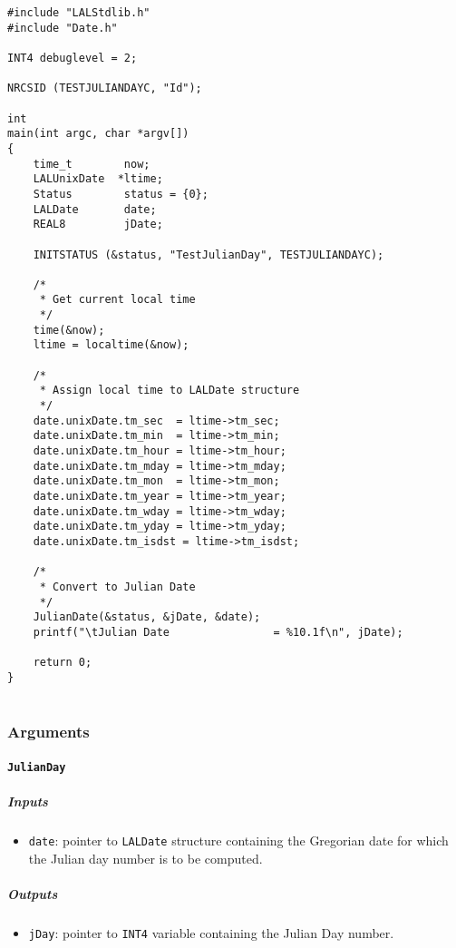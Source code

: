 \begin{verbatim}
#include "LALStdlib.h"
#include "Date.h"

INT4 debuglevel = 2;

NRCSID (TESTJULIANDAYC, "Id");

int
main(int argc, char *argv[])
{
    time_t        now;
    LALUnixDate  *ltime;
    Status        status = {0};
    LALDate       date;
    REAL8         jDate;

    INITSTATUS (&status, "TestJulianDay", TESTJULIANDAYC);

    /*
     * Get current local time
     */
    time(&now);
    ltime = localtime(&now);

    /*
     * Assign local time to LALDate structure 
     */
    date.unixDate.tm_sec  = ltime->tm_sec;
    date.unixDate.tm_min  = ltime->tm_min;
    date.unixDate.tm_hour = ltime->tm_hour;
    date.unixDate.tm_mday = ltime->tm_mday;
    date.unixDate.tm_mon  = ltime->tm_mon;
    date.unixDate.tm_year = ltime->tm_year;
    date.unixDate.tm_wday = ltime->tm_wday;
    date.unixDate.tm_yday = ltime->tm_yday;
    date.unixDate.tm_isdst = ltime->tm_isdst;

    /*
     * Convert to Julian Date
     */
    JulianDate(&status, &jDate, &date);
    printf("\tJulian Date                = %10.1f\n", jDate);

    return 0;
}


\end{verbatim}

\subsubsection{Arguments}

\paragraph{\texttt{JulianDay}}

\subparagraph{Inputs}

\begin{itemize}
    \item \texttt{date}: pointer to \texttt{LALDate} structure containing the
    Gregorian date for which the Julian day number is to be computed.
\end{itemize}

\subparagraph{Outputs}

\begin{itemize}
    \item \texttt{jDay}: pointer to \texttt{INT4} variable containing the
    Julian Day number.
\end{itemize}


